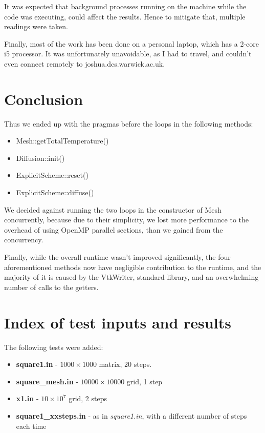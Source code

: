\documentclass[11pt,journal]{IEEEtran}
\begin{document}
	It was expected that background processes running on the machine while the code was executing, could affect the results. Hence to mitigate that, multiple readings were taken.
	
	Finally, most of the work has been done on a personal laptop, which has a 2-core i5 processor. It was unfortunately unavoidable, as I had to travel, and couldn't even connect remotely to joshua.dcs.warwick.ac.uk.
	
	
	\section{Conclusion}
	Thus we ended up with the pragmas before the loops in the following methods:
	\begin{itemize}
		\item Mesh::getTotalTemperature()
		\item Diffusion::init()
		\item ExplicitScheme::reset()
		\item ExplicitScheme::diffuse()
	\end{itemize}

	We decided against running the two loops in the constructor of Mesh concurrently, because due to their simplicity, we lost more performance to the overhead of using OpenMP parallel sections, than we gained from the concurrency.
	
	Finally, while the overall runtime wasn't improved significantly, the four aforementioned methods now have negligible contribution to the runtime, and the majority of it is caused by the VtkWriter, standard library, and an overwhelming number of calls to the getters.
	
	
	
	
	
	
	
		
		
	\appendices
	\section{Index of test inputs and results}
	The following tests were added:
	\begin{itemize}
		\item \textbf{square1.in} - $1000 \times 1000$ matrix, 20 steps.
		\item \textbf{square\_mesh.in} - $10000 \times 10000$ grid, 1 step
		\item \textbf{x1.in} - $10 \times 10^7$ grid, 2 steps
		\item \textbf{square1\_xxsteps.in} - as in \emph{square1.in}, with a different number of steps each time

	\end{itemize}
	
\end{document}
